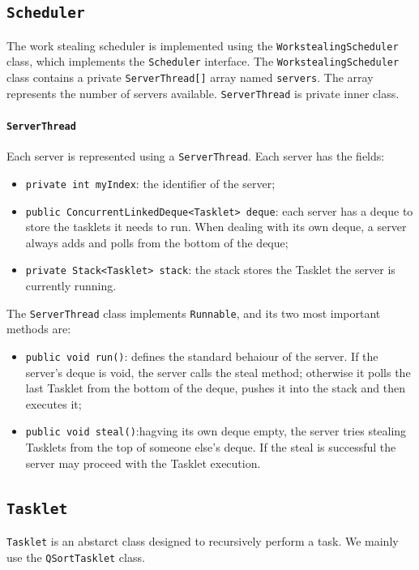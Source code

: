 \documentclass{article}
\def\code#1{\texttt{#1}}
\begin{document}
	\subsection{\code{Scheduler}}
	The work stealing scheduler is implemented using the \code{WorkstealingScheduler} class, which implements the \code{Scheduler} interface.
	The \code{WorkstealingScheduler} class contains a private \code{ServerThread[]} array named \code{servers}. The array represents the number of servers available.
	\code{ServerThread} is private inner class. 
	
	\paragraph {\code{ServerThread}}
	Each server is represented using a \code{ServerThread}. Each server has the fields:
	\begin{itemize}
		\item \code{private int myIndex}: the identifier of the server;
		\item \code{public ConcurrentLinkedDeque<Tasklet> deque}: each server has a deque to store the tasklets it needs to run. When dealing with its own deque, a server always adds and polls from the bottom of the deque;
		\item \code{private Stack<Tasklet> stack}: the stack stores the Tasklet the server is currently running.
	\end{itemize}
	The \code{ServerThread} class implements \code{Runnable}, and its two most important methods are:
	\begin{itemize}
		\item \code{public void run()}: defines the standard behaiour of the server. If the server's deque is void, the server calls the steal method; otherwise it polls the last Tasklet from the bottom of the deque, pushes it into the stack and then executes it;
		\item \code{public void steal()}:hagving its own deque empty, the server tries stealing Tasklets from the top of someone else's deque. If the steal is successful the server may proceed with the Tasklet execution.
	\end{itemize} 
	
	\subsection{\code{Tasklet}}
	\code{Tasklet} is an abstarct class designed to recursively perform a task. We mainly use the \code{QSortTasklet} class.
	
\end{document}
